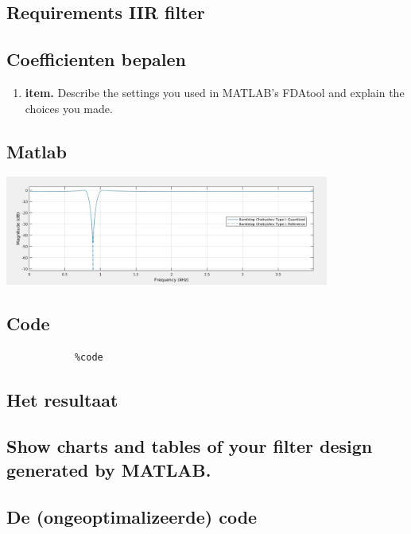 \documentclass[11pt,a4paper]{article}
\newcommand\litem[1]{\item{\bfseries#1.\space}}
\begin{document}
		\subsection{Requirements IIR filter}
	
		\subsection{Coefficienten bepalen}
	
		\begin{enumerate}[label=\emph{\alph*)}]
			\litem{item} Describe the settings you 					used in MATLAB’s FDAtool and explain the 					choices you made.
		\end{enumerate}
	
		\subsection{Matlab}
	
		\includegraphics[width=0.80\textwidth]{iirMatlab}\par\vspace{1cm}		
		
		\subsection{Code}

		\begin{lstlisting}
			%code
		\end{lstlisting}
		
		\subsection{Het resultaat}	

	\subsection{Show charts and tables of your filter design generated by MATLAB.}
	\clearpage
	
	\subsection{De (ongeoptimalizeerde) code}
\end{document}
